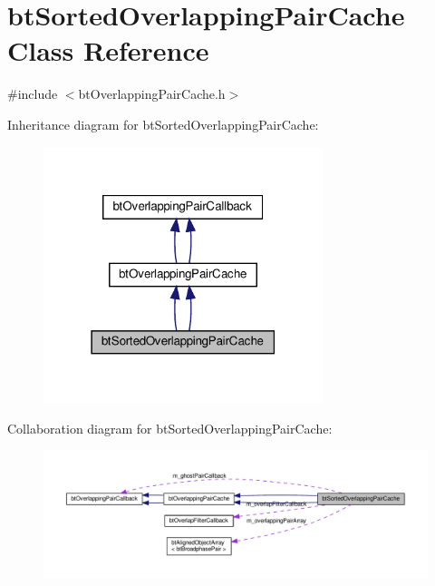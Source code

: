 \hypertarget{classbtSortedOverlappingPairCache}{}\section{bt\+Sorted\+Overlapping\+Pair\+Cache Class Reference}
\label{classbtSortedOverlappingPairCache}


{\ttfamily \#include $<$bt\+Overlapping\+Pair\+Cache.\+h$>$}



Inheritance diagram for bt\+Sorted\+Overlapping\+Pair\+Cache\+:
\nopagebreak
\begin{figure}[H]
\begin{center}
\leavevmode
\includegraphics[width=231pt]{classbtSortedOverlappingPairCache__inherit__graph}
\end{center}
\end{figure}


Collaboration diagram for bt\+Sorted\+Overlapping\+Pair\+Cache\+:
\nopagebreak
\begin{figure}[H]
\begin{center}
\leavevmode
\includegraphics[width=350pt]{classbtSortedOverlappingPairCache__coll__graph}
\end{center}
\end{figure}
